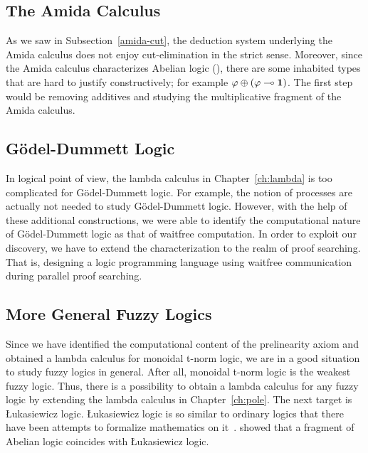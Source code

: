 \subsection{The Amida Calculus}

As we saw in Subsection~\ref{amida-cut},
the deduction system underlying the Amida calculus does not enjoy
cut-elimination in the strict sense.
Moreover, since the Amida calculus characterizes Abelian logic
(),
there are some inhabited types that are hard to justify constructively;
for example $\varphi\oplus(\varphi\multimap\mathbf{1})$.
The first step would be removing additives and studying the
multiplicative fragment of the Amida calculus.

\subsection{G\"odel-Dummett Logic}

In logical point of view, the lambda calculus in Chapter~\ref{ch:lambda}
is too complicated for G\"odel-Dummett logic.
For example, the notion of processes are actually not needed to study
G\"odel-Dummett logic.  However, with the help of these additional
constructions,
we were able to identify the computational nature of G\"odel-Dummett
logic as that of waitfree computation.
In order to exploit our discovery, we have to extend the
characterization to the realm of proof searching.  That is, designing a
logic programming language using waitfree communication during parallel
proof searching.

\subsection{More General Fuzzy Logics}

Since we have identified the computational content of the prelinearity
axiom and obtained a lambda calculus for monoidal t-norm logic, we are
in a good situation to study fuzzy logics in general.
After all, monoidal t-norm logic is the weakest fuzzy logic.
Thus, there is a possibility to obtain a lambda calculus for any fuzzy
logic by extending the lambda calculus in Chapter~\ref{ch:pole}.
The next target is \L{}ukasiewicz logic.  \L{}ukasiewicz logic is so
similar to ordinary logics that there have been attempts to formalize
mathematics on
it~\citep{Hajek:TheJournalOfSymbolicLogic:2000,hajek2005,yatabe2009}.
\citet[Theorem~9]{metcalfe2002} showed that a fragment of Abelian logic
coincides with \L{}ukasiewicz logic.

